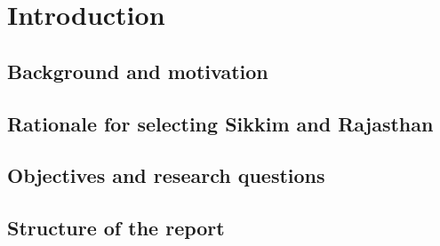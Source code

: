 \section{Introduction}
\lipsum[40]
\subsection{Background and motivation}
\lipsum[40]
\subsection{Rationale for selecting Sikkim and Rajasthan}
\subsection{Objectives and research questions}
\subsection{Structure of the report}